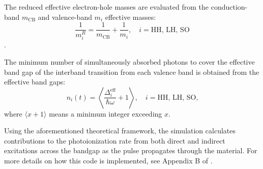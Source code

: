 The reduced effective electron-hole masses are evaluated from the conduction-band $m_{\textrm{CB}}$ and valence-band $m_i$ effective masses:
\begin{equation}
\frac{1}{m_i^R} = \frac{1}{m_{\textrm{CB}}} + \frac{1}{m_i}, \quad i = \textrm{HH, LH, SO}
\end{equation}.

The minimum number of simultaneously absorbed photons to cover the effective band gap of the interband transition from each valence band is obtained from the effective band gaps:
\begin{equation}
n_i(t) = \left\langle  \frac{\Delta_i^{\textrm{eff}}}{\hbar \omega} + 1 \right\rangle, \quad i = \textrm{HH, LH, SO,}
\label{eqn:min_number_photons}
\end{equation}
where $\langle x+1 \rangle$ means a minimum integer exceeding $x$.

Using the aforementioned theoretical framework, the simulation calculates contributions to the photoionization rate from both direct and indirect excitations across the bandgap as the pulse propagates through the material. For more details on how this code is implemented, see Appendix B of \cite{austinSemiconductorSurfaceModification2017}.


